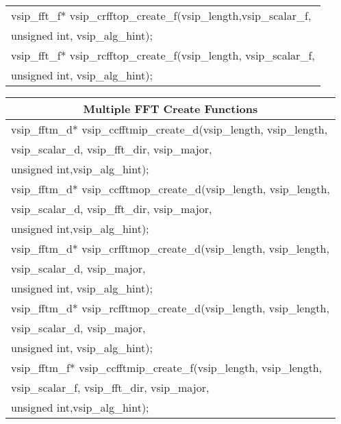 {\begin{tabular}[H]{|l|}
vsip\_fft\_f* vsip\_crfftop\_create\_f(vsip\_length,vsip\_scalar\_f,\\*\hspace{.7cm}unsigned int, vsip\_alg\_hint);\\
vsip\_fft\_f* vsip\_rcfftop\_create\_f(vsip\_length, vsip\_scalar\_f,\\*\hspace{.7cm}unsigned int, vsip\_alg\_hint);\\\hline
\end{tabular}
\newline\hspace*{0.5cm} 
\begin{tabular}[H]{|l|}
\multicolumn{1}{c}{\rmfamily \bfseries Multiple FFT Create Functions}\\ \hline
vsip\_fftm\_d* vsip\_ccfftmip\_create\_d(vsip\_length, vsip\_length,\\*\hspace{.7cm}vsip\_scalar\_d, vsip\_fft\_dir, vsip\_major,\\*\hspace{.7cm} unsigned int,vsip\_alg\_hint);\\
vsip\_fftm\_d* vsip\_ccfftmop\_create\_d(vsip\_length, vsip\_length,\\*\hspace{.7cm}vsip\_scalar\_d, vsip\_fft\_dir, vsip\_major,\\*\hspace{.7cm} unsigned int,vsip\_alg\_hint);\\
vsip\_fftm\_d* vsip\_crfftmop\_create\_d(vsip\_length, vsip\_length,\\*\hspace{.7cm}vsip\_scalar\_d, vsip\_major,\\*\hspace{.7cm} unsigned int, vsip\_alg\_hint);\\
vsip\_fftm\_d* vsip\_rcfftmop\_create\_d(vsip\_length, vsip\_length,\\*\hspace{.7cm}vsip\_scalar\_d, vsip\_major,\\*\hspace{.7cm} unsigned int, vsip\_alg\_hint);\\
vsip\_fftm\_f* vsip\_ccfftmip\_create\_f(vsip\_length, vsip\_length,\\*\hspace{.7cm}vsip\_scalar\_f, vsip\_fft\_dir, vsip\_major,\\*\hspace{.7cm} unsigned int,vsip\_alg\_hint);\\

\end{tabular}}
